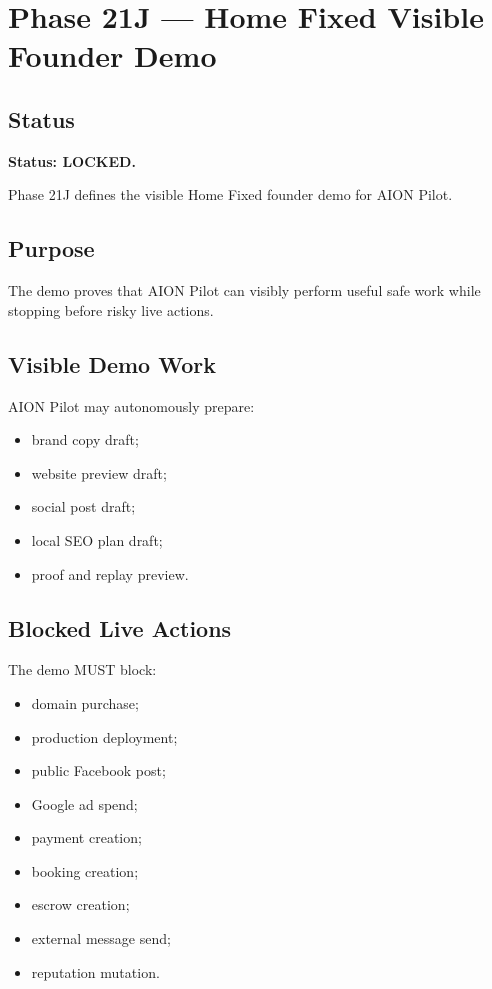 \section{Phase 21J --- Home Fixed Visible Founder Demo}
\label{sec:aion-phase21j-home-fixed-visible-founder-demo}

\subsection{Status}

\textbf{Status: LOCKED.}

Phase 21J defines the visible Home Fixed founder demo for AION Pilot.

\subsection{Purpose}

The demo proves that AION Pilot can visibly perform useful safe work while stopping before risky live actions.

\subsection{Visible Demo Work}

AION Pilot may autonomously prepare:

\begin{itemize}
  \item brand copy draft;
  \item website preview draft;
  \item social post draft;
  \item local SEO plan draft;
  \item proof and replay preview.
\end{itemize}

\subsection{Blocked Live Actions}

The demo MUST block:

\begin{itemize}
  \item domain purchase;
  \item production deployment;
  \item public Facebook post;
  \item Google ad spend;
  \item payment creation;
  \item booking creation;
  \item escrow creation;
  \item external message send;
  \item reputation mutation.
\end{itemize}

